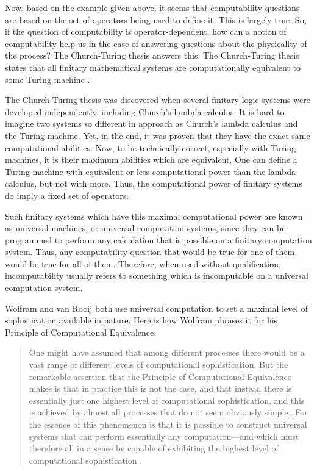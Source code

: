 Now, based on the example given above, it seems that computability questions are based on the set of operators being used to define it.  This is largely true.  So, if the question of computability is operator-dependent, how can a notion of computability help us in the case of answering questions about the physicality of the process?  The Church-Turing thesis answers this.  The Church-Turing thesis states that all finitary mathematical systems are computationally equivalent to some Turing machine \citep{turing1939}.    

The Church-Turing thesis was discovered when several finitary logic systems were developed independently, including Church's lambda calculus.  It is hard to imagine two systems so different in approach as Church's lambda calculus and the Turing machine.  Yet, in the end, it was proven that they have the exact same computational abilities.  Now, to be technically correct, especially with Turing machines, it is their maximum abilities which are equivalent.  One can define a Turing machine with equivalent or less computational power than the lambda calculus, but not with more.  Thus, the computational power of finitary systems do imply a fixed set of operators.  

Such finitary systems which have this maximal computational power are known as universal machines, or universal computation systems, since they can be programmed to perform any calculation that is possible on a finitary computation system.  Thus, any computability question that would be true for one of them would be true for all of them.  Therefore, when used without qualification, incomputability usually refers to something which is incomputable on a universal computation system.

Wolfram and van Rooij both use universal computation to set a maximal level of sophistication available in nature.  Here is how Wolfram phrases it for his Principle of Computational Equivalence:

\begin{quote}
One might have assumed that among different processes there would be a vast range of different levels of computational sophistication.  But the remarkable assertion that the Principle of Computational Equivalence makes is that in practice this is not the case, and that instead there is essentially just one highest level of computational sophistication, and this is achieved by almost all processes that do not seem obviously simple...For the essence of this phenomenon is that it is possible to construct universal systems that can perform essentially any computation---and which must therefore all in a sense be capable of exhibiting the highest level of computational sophistication \citep[][p.~717]{wolfram2002}.
\end{quote}

